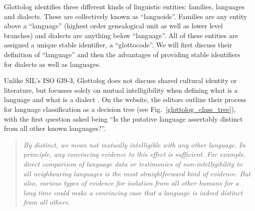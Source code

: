 \documentclass[a4paper,10pt]{article} %
\begin{document}
Glottolog identifies three different kinds of linguistic entities: families, languages and dialects. These are collectively known as ``languoids''. Families are any entity above a ``language'' (highest order genealogical unit as well as lower level branches) and dialects are anything below ``language''. All of these entities are assigned a unique stable identifier, a ``glottocode''. We will first discuss their definition of ``language'' and then the advantages of providing stable identifiers for dialects as well as languages.

Unlike SIL's ISO 639-3, Glottolog does not discuss shared cultural identity or literature, but focusses solely on mutual intelligibility when defining what is a language and what is a dialect \citep{glottologlanguoids}. On the website, the editors outline their process for language classification as a decision tree (see Fig.~\ref{glottolog_class_tree}), with the first question asked being ``Is the putative language assertably distinct from all other known languages?''. 

\begin{quotation}
\noindent\emph{By distinct, we mean not mutually intelligible with any other language. In principle, any convincing evidence to this effect is sufficient. For example, direct comparison of language data or testimonies of non-intelligibility to all neighbouring languages is the most straightforward kind of evidence. But also, various types of evidence for isolation from all other humans for a long time could make a convincing case that a language is indeed distinct from all others.}
\end{quotation}
\begin{flushright} \citep{glottologlanguoids}\end{flushright}
\end{document}
